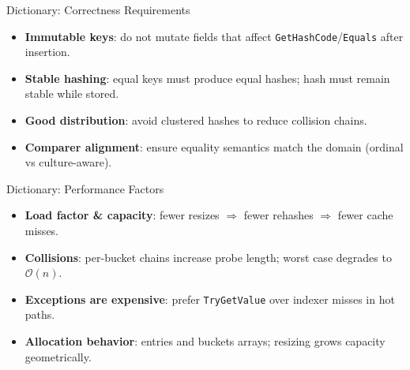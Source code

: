 \documentclass[aspectratio=169]{beamer}
\newcommand{\bigO}[1]{$\mathcal{O}(#1)$}
\newcommand{\code}[1]{\texttt{#1}}
\begin{document}
\begin{frame}{Dictionary: Correctness Requirements}
  \begin{itemize}
    \item \textbf{Immutable keys}: do not mutate fields that affect \code{GetHashCode}/\code{Equals} after insertion.
    \item \textbf{Stable hashing}: equal keys must produce equal hashes; hash must remain stable while stored.
    \item \textbf{Good distribution}: avoid clustered hashes to reduce collision chains.
    \item \textbf{Comparer alignment}: ensure equality semantics match the domain (ordinal vs culture-aware).
  \end{itemize}
\end{frame}

\begin{frame}{Dictionary: Performance Factors}
  \begin{itemize}
    \item \textbf{Load factor \& capacity}: fewer resizes $\Rightarrow$ fewer rehashes $\Rightarrow$ fewer cache misses.
    \item \textbf{Collisions}: per-bucket chains increase probe length; worst case degrades to \bigO{n}.
    \item \textbf{Exceptions are expensive}: prefer \code{TryGetValue} over indexer misses in hot paths.
    \item \textbf{Allocation behavior}: entries and buckets arrays; resizing grows capacity geometrically.
  \end{itemize}
\end{frame}
\end{document}
